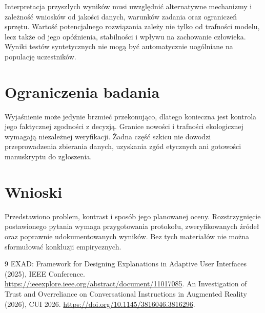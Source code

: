 \documentclass[11pt,a4paper]{article}
\begin{document}
Interpretacja przyszłych wyników musi uwzględnić alternatywne mechanizmy i zależność wniosków od jakości danych, warunków zadania oraz ograniczeń sprzętu. Wartość potencjalnego rozwiązania zależy nie tylko od trafności modelu, lecz także od jego opóźnienia, stabilności i wpływu na zachowanie człowieka. Wyniki testów syntetycznych nie mogą być automatycznie uogólniane na populację uczestników.

\section{Ograniczenia badania}

Wyjaśnienie może jedynie brzmieć przekonująco, dlatego konieczna jest kontrola jego faktycznej zgodności z decyzją. Granice nowości i trafności ekologicznej wymagają niezależnej weryfikacji. Żadna część szkicu nie dowodzi przeprowadzenia zbierania danych, uzyskania zgód etycznych ani gotowości manuskryptu do zgłoszenia.

\section{Wnioski}

Przedstawiono problem, kontrast i sposób jego planowanej oceny. Rozstrzygnięcie postawionego pytania wymaga przygotowania protokołu, zweryfikowanych źródeł oraz poprawnie udokumentowanych wyników. Bez tych materiałów nie można sformułować konkluzji empirycznych.

\begin{thebibliography}{9}
 EXAD: Framework for Designing Explanations in Adaptive User Interfaces (2025), IEEE Conference. \url{https://ieeexplore.ieee.org/abstract/document/11017085}.
 An Investigation of Trust and Overreliance on Conversational Instructions in Augmented Reality (2026), CUI 2026. \url{https://doi.org/10.1145/3816046.3816296}.
\end{thebibliography}
\end{document}
